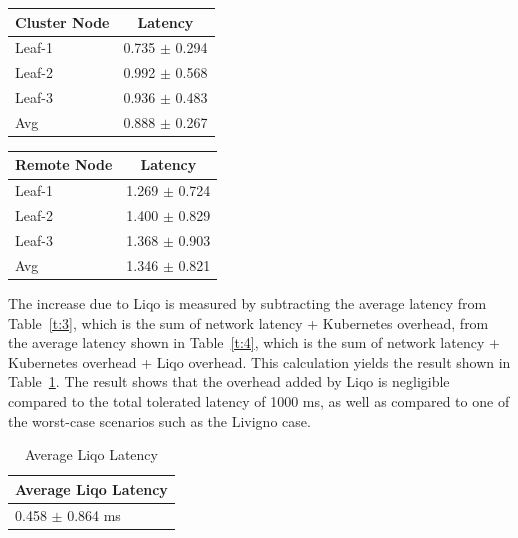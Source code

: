 \begin{minipage}{0.45\textwidth}
  \centering
  \vspace{0.5cm}
  \begin{tabular}{|l|c|}
  \hline
  \textbf{Cluster Node} & \textbf{Latency}  \\ 
  \hline
  Leaf-1 & 0.735 $\pm$ 0.294  \\
  \hline
  Leaf-2 & 0.992 $\pm$ 0.568 \\
  \hline
  Leaf-3 & 0.936 $\pm$ 0.483 \\
  \hline
  Avg & 0.888 $\pm$ 0.267 \\
  \hline
  \end{tabular}
  \label{t:3}\vspace{0.5cm}
\end{minipage}%
\hspace{0.05\textwidth} %
\begin{minipage}{0.45\textwidth}
  \centering
  \vspace{0.5cm}
  \begin{tabular}{|l|c|}
  \hline
  \textbf{Remote Node} & \textbf{Latency}  \\ 
  \hline
  Leaf-1 & 1.269 $\pm$ 0.724  \\
  \hline
  Leaf-2 & 1.400 $\pm$ 0.829 \\
  \hline
  Leaf-3 & 1.368 $\pm$ 0.903 \\
  \hline
  Avg & 1.346 $\pm$ 0.821 \\
  \hline
  \end{tabular}
  \label{t:4}\vspace{0.5cm}
\end{minipage}

The increase due to Liqo is measured by subtracting the average latency from Table~\ref{t:3}, which is the sum of network latency + Kubernetes overhead, from the average latency shown in Table~\ref{t:4}, which is the sum of network latency + Kubernetes overhead + Liqo overhead. This calculation yields the result shown in Table~\ref{t:5}. The result shows that the overhead added by Liqo is negligible compared to the total tolerated latency of 1000 ms, as well as compared to one of the worst-case scenarios such as the Livigno case.

\begin{table}[ht]              
\centering 
\begin{tabular}{|l|}
\hline
\textbf{Average Liqo Latency} \\ 
\hline
0.458  $\pm$ 0.864 ms \\
\hline
\end{tabular}
\caption{Average Liqo Latency} \label{t:5}  
\end{table}

